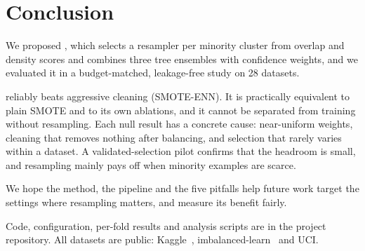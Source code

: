 \section{Conclusion}\label{sec:conclusion}
We proposed \ars{}, which selects a resampler per minority cluster from overlap and density scores and combines three
tree ensembles with confidence weights, and we evaluated it in a budget-matched, leakage-free study on 28 datasets.

\ars{} reliably beats aggressive cleaning (SMOTE-ENN). It is practically equivalent to plain SMOTE and to its own
ablations, and it cannot be separated from training without resampling. Each null result has a concrete cause:
near-uniform weights, cleaning that removes nothing after balancing, and selection that rarely varies within a
dataset. A validated-selection pilot confirms that the headroom is small, and resampling mainly pays off when minority
examples are scarce.

We hope the method, the pipeline and the five pitfalls help future work target the settings where resampling matters,
and measure its benefit fairly.

Code, configuration, per-fold results and analysis scripts are in the project repository. All datasets are public:
Kaggle~\cite{dalpozzolo2015calibrating}, imbalanced-learn~\cite{lemaitre2017imbalanced} and UCI.
